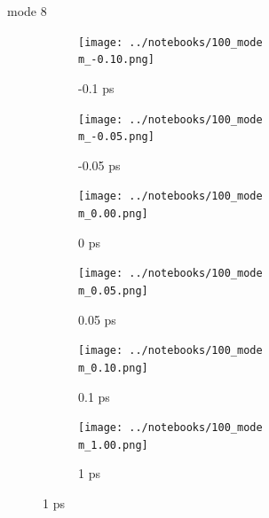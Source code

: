 \documentclass{beamer}
\begin{document}
\renewcommand\m{8}
\begin{frame}{mode \m}
	\begin{figure}
		\centering
		\begin{subfigure}[b]{\w\textwidth}
			\centering
			\texttt{[image: ../notebooks/100\_mode\\m\_-0.10.png]}
			\caption{-0.1 ps}
		\end{subfigure}
		\begin{subfigure}[b]{\w\textwidth}
			\centering
			\texttt{[image: ../notebooks/100\_mode\\m\_-0.05.png]}
			\caption{-0.05 ps}
		\end{subfigure}
		\begin{subfigure}[b]{\w\textwidth}
			\centering
			\texttt{[image: ../notebooks/100\_mode\\m\_0.00.png]}
			\caption{0 ps}
		\end{subfigure}
		\begin{subfigure}[b]{\w\textwidth}
			\centering
			\texttt{[image: ../notebooks/100\_mode\\m\_0.05.png]}
			\caption{0.05 ps}
		\end{subfigure}
		\begin{subfigure}[b]{\w\textwidth}
			\centering
			\texttt{[image: ../notebooks/100\_mode\\m\_0.10.png]}
			\caption{0.1 ps}
		\end{subfigure}
		\begin{subfigure}[b]{\w\textwidth}
			\centering
			\texttt{[image: ../notebooks/100\_mode\\m\_1.00.png]}
			\caption{1 ps}
		\end{subfigure}
	\end{figure}
\end{frame}
\end{document}
